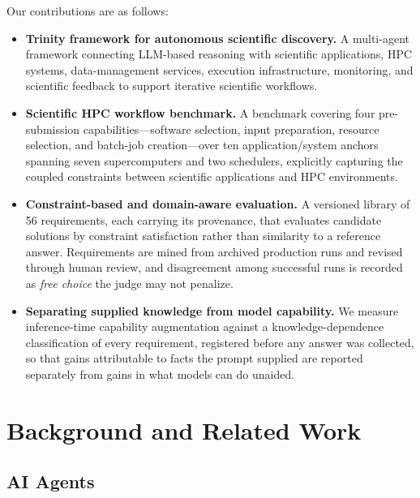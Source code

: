 \documentclass[conference]{IEEEtran}
\begin{document}
Our contributions are as follows:
\begin{itemize}
\item \textbf{Trinity framework for autonomous scientific discovery.} A multi-agent framework connecting LLM-based reasoning with scientific applications, HPC systems, data-management services, execution infrastructure, monitoring, and scientific feedback to support iterative scientific workflows.

\item \textbf{Scientific HPC workflow benchmark.} A benchmark covering four pre-submission capabilities---software selection, input preparation, resource selection, and batch-job creation---over ten application/system anchors spanning seven supercomputers and two schedulers, explicitly capturing the coupled constraints between scientific applications and HPC environments.

\item \textbf{Constraint-based and domain-aware evaluation.} A versioned library of 56 requirements, each carrying its provenance, that evaluates candidate solutions by constraint satisfaction rather than similarity to a reference answer. Requirements are mined from archived production runs and revised through human review, and disagreement among successful runs is recorded as \emph{free choice} the judge may not penalize.

\item \textbf{Separating supplied knowledge from model capability.} We measure inference-time capability augmentation against a knowledge-dependence classification of every requirement, registered before any answer was collected, so that gains attributable to facts the prompt supplied are reported separately from gains in what models can do unaided.
\end{itemize}

\section{Background and Related Work}\label{sec:related}

\subsection{AI Agents}
\end{document}
